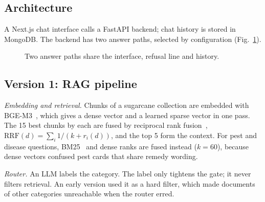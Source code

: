 \documentclass[conference]{IEEEtran}
\begin{document}
\subsection{Architecture}
A Next.js chat interface calls a FastAPI backend; chat history is stored in MongoDB. The
backend has two answer paths, selected by configuration (Fig.~\ref{fig:arch}).

\begin{figure}[t]
\centering
{}
\caption{Two answer paths share the interface, refusal line and history.}
\label{fig:arch}
\end{figure}

\subsection{Version 1: RAG pipeline}
\textit{Embedding and retrieval.} Chunks of a sugarcane collection are embedded with BGE-M3~\cite{chen2024bgem3}, which gives a dense vector and a learned sparse vector in one pass. The 15 best
chunks by each are fused by reciprocal rank fusion~\cite{cormack2009rrf},
$\mathrm{RRF}(d)=\sum_i 1/(k+r_i(d))$, and the top 5 form the context. For pest and disease
questions, BM25~\cite{robertson2009bm25} and dense ranks are fused instead ($k=60$), because dense vectors confused
pest cards that share remedy wording.

\textit{Router.} An LLM labels the category. The label only tightens the gate; it never
filters retrieval. An early version used it as a hard filter, which made documents of other
categories unreachable when the router erred.
\end{document}
